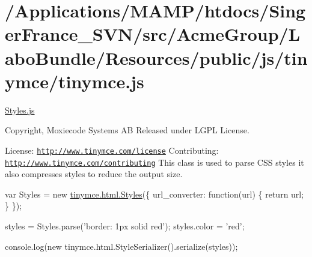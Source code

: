 \hypertarget{_2_applications_2_m_a_m_p_2htdocs_2_singer_france__s_v_n_2src_2_acme_group_2_labo_bundle_2_resou31b855046f40bc2bd46e0073dde32d8c}{\section{/\+Applications/\+M\+A\+M\+P/htdocs/\+Singer\+France\+\_\+\+S\+V\+N/src/\+Acme\+Group/\+Labo\+Bundle/\+Resources/public/js/tinymce/tinymce.\+js}
}
\hyperlink{_styles_8js}{Styles.\+js}

Copyright, Moxiecode Systems A\+B Released under L\+G\+P\+L License.

License\+: \href{http://www.tinymce.com/license}{\tt http\+://www.\+tinymce.\+com/license} Contributing\+: \href{http://www.tinymce.com/contributing}{\tt http\+://www.\+tinymce.\+com/contributing} This class is used to parse C\+S\+S styles it also compresses styles to reduce the output size.

var Styles = new \hyperlink{classtinymce_1_1html_1_1_styles}{tinymce.\+html.\+Styles}(\{ url\+\_\+converter\+: function(url) \{ return url; \} \});

styles = Styles.\+parse('border\+: 1px solid red'); styles.\+color = 'red';

console.\+log(new tinymce.\+html.\+Style\+Serializer().serialize(styles));


\begin{DoxyCodeInclude}
\end{DoxyCodeInclude}
 